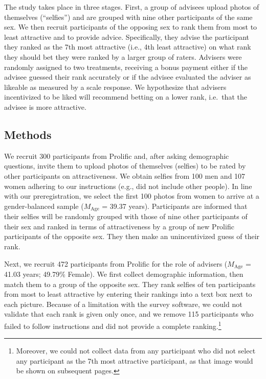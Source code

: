 \documentclass[
  man,
  floatsintext,
  longtable,
  nolmodern,
  notxfonts,
  notimes,
  colorlinks=true,linkcolor=blue,citecolor=blue,urlcolor=blue]{apa7}
\begin{document}
The study takes place in three stages. First, a group of advisees upload
photos of themselves (``selfies'') and are grouped with nine other
participants of the same sex. We then recruit participants of the
opposing sex to rank them from most to least attractive and to provide
advice. Specifically, they advise the participant they ranked as the 7th
most attractive (i.e., 4th least attractive) on what rank they should
bet they were ranked by a larger group of raters. Advisers were randomly
assigned to two treatments, receiving a bonus payment either if the
advisee guessed their rank accurately or if the advisee evaluated the
adviser as likeable as measured by a scale response. We hypothesize that
advisers incentivized to be liked will recommend betting on a lower
rank, i.e.~that the advisee is more attractive.

\subsection{Methods}\label{methods-1}

We recruit 300 participants from Prolific and, after asking demographic
questions, invite them to upload photos of themselves (selfies) to be
rated by other participants on attractiveness. We obtain selfies from
100 men and 107 women adhering to our instructions (e.g., did not
include other people). In line with our preregistration, we select the
first 100 photos from women to arrive at a gender-balanced sample
(\(M_{\text{Age}}\) = 39.37 years). Participants are informed that their
selfies will be randomly grouped with those of nine other participants
of their sex and ranked in terms of attractiveness by a group of new
Prolific participants of the opposite sex. They then make an
unincentivized guess of their rank.

Next, we recruit 472 participants from Prolific for the role of advisers
(\(M_{\text{Age}}\) = 41.03 years; 49.79\% Female). We first collect
demographic information, then match them to a group of the opposite sex.
They rank selfies of ten participants from most to least attractive by
entering their rankings into a text box next to each picture. Because of
a limitation with the survey software, we could not validate that each
rank is given only once, and we remove 115 participants who failed to
follow instructions and did not provide a complete ranking.\footnote{Moreover,
  we could not collect data from any participant who did not select any
  participant as the 7th most attractive participant, as that image
  would be shown on subsequent pages.}
\end{document}
